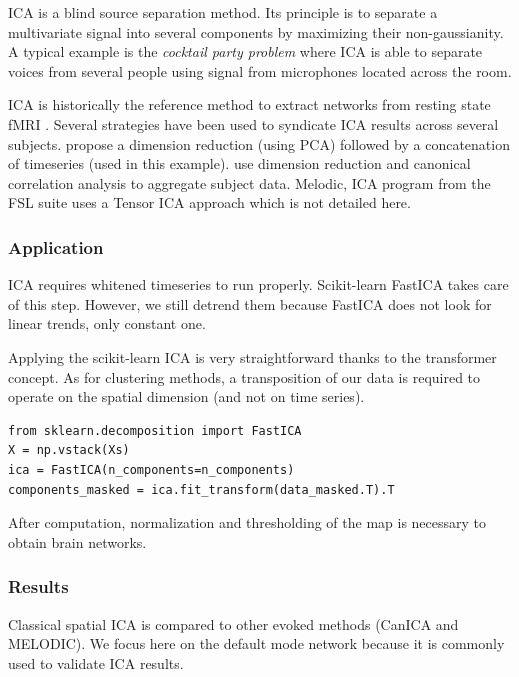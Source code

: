 \documentclass{frontiersSCNS} %
\newcounter{x}
\newcounter{y}
\newcounter{z}
\begin{document}
ICA is a blind source separation method. Its principle is to separate a
multivariate signal into several components by maximizing their non-gaussianity.
A typical example is the \emph{cocktail party problem} where ICA is able to separate
voices from several people using signal from microphones located across the room.

ICA is historically the reference method to extract networks from resting state
fMRI \cite{biswal1999}. Several strategies have been used to syndicate ICA
results across several subjects. \cite{calhoun2001a} propose a dimension
reduction (using PCA) followed by a concatenation of timeseries (used in this
example). \cite{varoquaux2010} use dimension reduction and canonical correlation analysis
to aggregate subject data. Melodic, ICA program from the FSL suite uses a Tensor
ICA approach which is not detailed here.

\subsubsection{Application}

ICA requires whitened timeseries to run properly. Scikit-learn FastICA takes care
of this step. However, we still detrend them because
FastICA does not look for linear trends, only constant one.

Applying the scikit-learn ICA is very straightforward thanks to the transformer
concept. As for clustering methods, a transposition of our data is required to
operate on the spatial dimension (and not on time series).

\begin{lstlisting}
from sklearn.decomposition import FastICA
X = np.vstack(Xs)
ica = FastICA(n_components=n_components)
components_masked = ica.fit_transform(data_masked.T).T
\end{lstlisting}

After computation, normalization and thresholding of the map is necessary to
obtain brain networks.

\subsubsection{Results}

Classical spatial ICA is compared to other evoked methods (CanICA and MELODIC).
We focus here on the default mode network because it is commonly used to
validate ICA results.
\end{document}
